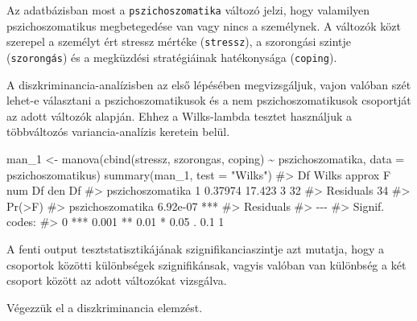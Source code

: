\documentclass[
  letterpaper,
]{krantz}
\makeatletter
\newenvironment{Shaded}{\begin{snugshade}}{\end{snugshade}}
\newcommand{\AttributeTok}[1]{\textcolor[rgb]{0.40,0.45,0.13}{#1}}
\newcommand{\CommentTok}[1]{\textcolor[rgb]{0.37,0.37,0.37}{#1}}
\newcommand{\FunctionTok}[1]{\textcolor[rgb]{0.28,0.35,0.67}{#1}}
\newcommand{\NormalTok}[1]{\textcolor[rgb]{0.00,0.23,0.31}{#1}}
\newcommand{\OtherTok}[1]{\textcolor[rgb]{0.00,0.23,0.31}{#1}}
\newcommand{\SpecialCharTok}[1]{\textcolor[rgb]{0.37,0.37,0.37}{#1}}
\newcommand{\StringTok}[1]{\textcolor[rgb]{0.13,0.47,0.30}{#1}}
\newenvironment{kframe}{%
\medskip{}
\setlength{\fboxsep}{.8em}
 \def\at@end@of@kframe{}%
 \ifinner\ifhmode%
  \def\at@end@of@kframe{\end{minipage}}%
  \begin{minipage}{\columnwidth}%
 \fi\fi%
 \def\FrameCommand##1{\hskip\@totalleftmargin \hskip-\fboxsep
 \colorbox{shadecolor}{##1}\hskip-\fboxsep
     \hskip-\linewidth \hskip-\@totalleftmargin \hskip\columnwidth}%
 \MakeFramed {\advance\hsize-\width
   \@totalleftmargin\z@ \linewidth\hsize
   \@setminipage}}%
 {\par\unskip\endMakeFramed%
 \at@end@of@kframe}
\renewenvironment{Shaded}{\begin{kframe}}{\end{kframe}}
\makeatother
\begin{document}
Az adatbázisban most a \texttt{pszichoszomatika} változó jelzi, hogy
valamilyen pszichoszomatikus megbetegedése van vagy nincs a személynek.
A változók közt szerepel a személyt ért stressz mértéke
(\texttt{stressz}), a szorongási szintje (\texttt{szorongás}) és a
megküzdési stratégiáinak hatékonysága (\texttt{coping}).

A diszkriminancia-analízisben az első lépésében megvizsgáljuk, vajon
valóban szét lehet-e választani a pszichoszomatikusok és a nem
pszichoszomatikusok csoportját az adott változók alapján. Ehhez a
Wilks-lambda tesztet használjuk a többváltozós variancia-analízis
keretein belül.

\begin{Shaded}
\begin{Highlighting}[]
\NormalTok{man\_1 }\OtherTok{\textless{}{-}} \FunctionTok{manova}\NormalTok{(}\FunctionTok{cbind}\NormalTok{(stressz, szorongas, coping) }\SpecialCharTok{\textasciitilde{}}\NormalTok{ pszichoszomatika,}
    \AttributeTok{data =}\NormalTok{ pszichoszomatikus)}
\FunctionTok{summary}\NormalTok{(man\_1, }\AttributeTok{test =} \StringTok{"Wilks"}\NormalTok{)}
\CommentTok{\#\textgreater{}                  Df   Wilks approx F num Df den Df}
\CommentTok{\#\textgreater{} pszichoszomatika  1 0.37974   17.423      3     32}
\CommentTok{\#\textgreater{} Residuals        34                               }
\CommentTok{\#\textgreater{}                    Pr(\textgreater{}F)    }
\CommentTok{\#\textgreater{} pszichoszomatika 6.92e{-}07 ***}
\CommentTok{\#\textgreater{} Residuals                    }
\CommentTok{\#\textgreater{} {-}{-}{-}}
\CommentTok{\#\textgreater{} Signif. codes:  }
\CommentTok{\#\textgreater{} 0 \textquotesingle{}***\textquotesingle{} 0.001 \textquotesingle{}**\textquotesingle{} 0.01 \textquotesingle{}*\textquotesingle{} 0.05 \textquotesingle{}.\textquotesingle{} 0.1 \textquotesingle{} \textquotesingle{} 1}
\end{Highlighting}
\end{Shaded}

A fenti output tesztstatisztikájának szignifikanciaszintje azt mutatja,
hogy a csoportok közötti különbségek szignifikánsak, vagyis valóban van
különbség a két csoport között az adott változókat vizsgálva.

Végezzük el a diszkriminancia elemzést.
\end{document}

